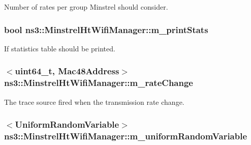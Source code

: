 Number of rates per group Minstrel should consider. 

\subsubsection[{\texorpdfstring{m\+\_\+print\+Stats}{m_printStats}}]{\setlength{\rightskip}{0pt plus 5cm}bool ns3\+::\+Minstrel\+Ht\+Wifi\+Manager\+::m\+\_\+print\+Stats\hspace{0.3cm}{\ttfamily [private]}}\hypertarget{classns3_1_1MinstrelHtWifiManager_a0e2d19e84336ab6d788afd81a6ba9cdb}{}\label{classns3_1_1MinstrelHtWifiManager_a0e2d19e84336ab6d788afd81a6ba9cdb}


If statistics table should be printed. 

\subsubsection[{\texorpdfstring{m\+\_\+rate\+Change}{m_rateChange}}]{$<$uint64\+\_\+t, {\bf Mac48\+Address}$>$ ns3\+::\+Minstrel\+Ht\+Wifi\+Manager\+::m\+\_\+rate\+Change\hspace{0.3cm}{\ttfamily [private]}}\hypertarget{classns3_1_1MinstrelHtWifiManager_a40f1adcf50b778a96c87e16db15e950f}{}\label{classns3_1_1MinstrelHtWifiManager_a40f1adcf50b778a96c87e16db15e950f}
The trace source fired when the transmission rate change. 
\subsubsection[{\texorpdfstring{m\+\_\+uniform\+Random\+Variable}{m_uniformRandomVariable}}]{$<${\bf Uniform\+Random\+Variable}$>$ ns3\+::\+Minstrel\+Ht\+Wifi\+Manager\+::m\+\_\+uniform\+Random\+Variable\hspace{0.3cm}{\ttfamily [private]}}\hypertarget{classns3_1_1MinstrelHtWifiManager_ad2dbdd143ca703a4366ed562b6ece239}{}\label{classns3_1_1MinstrelHtWifiManager_ad2dbdd143ca703a4366ed562b6ece239}


